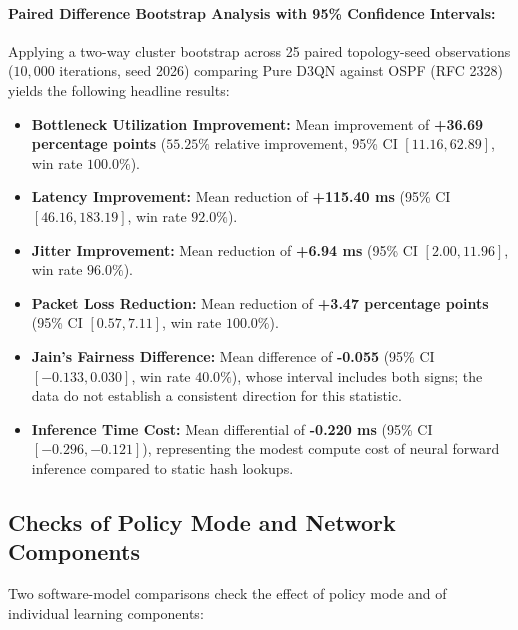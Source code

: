 \documentclass[12pt,a4paper,oneside]{report}
\begin{document}
\paragraph{Paired Difference Bootstrap Analysis with 95\% Confidence Intervals:}
Applying a two-way cluster bootstrap across 25 paired topology-seed observations ($10,000$ iterations, seed 2026) comparing Pure D3QN against OSPF (RFC 2328) yields the following headline results:
\begin{itemize}
    \item \textbf{Bottleneck Utilization Improvement:} Mean improvement of \textbf{+36.69 percentage points} ($55.25\%$ relative improvement, 95\% CI $[11.16, 62.89]$, win rate $100.0\%$).
    \item \textbf{Latency Improvement:} Mean reduction of \textbf{+115.40 ms} (95\% CI $[46.16, 183.19]$, win rate $92.0\%$).
    \item \textbf{Jitter Improvement:} Mean reduction of \textbf{+6.94 ms} (95\% CI $[2.00, 11.96]$, win rate $96.0\%$).
    \item \textbf{Packet Loss Reduction:} Mean reduction of \textbf{+3.47 percentage points} (95\% CI $[0.57, 7.11]$, win rate $100.0\%$).
    \item \textbf{Jain's Fairness Difference:} Mean difference of \textbf{-0.055} (95\% CI $[-0.133, 0.030]$, win rate $40.0\%$), whose interval includes both signs; the data do not establish a consistent direction for this statistic.
    \item \textbf{Inference Time Cost:} Mean differential of \textbf{-0.220 ms} (95\% CI $[-0.296, -0.121]$), representing the modest compute cost of neural forward inference compared to static hash lookups.
\end{itemize}

\subsection{Checks of Policy Mode and Network Components}
Two software-model comparisons check the effect of policy mode and of individual learning components:
\end{document}
